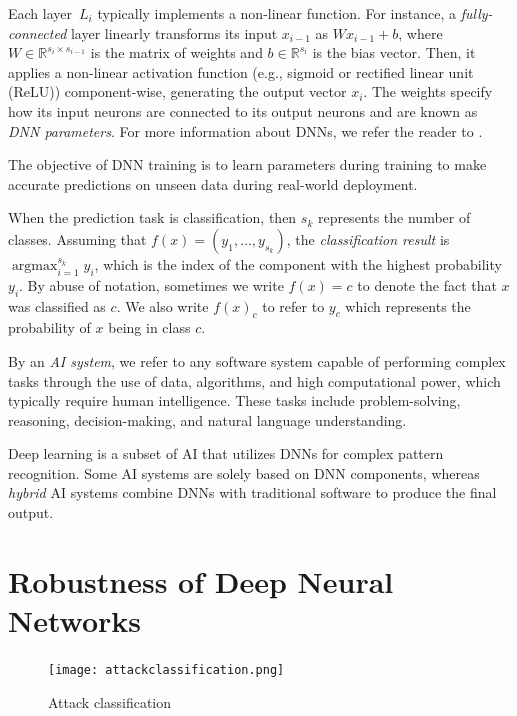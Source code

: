 Each layer~$L_i$ typically implements a non-linear function. For instance, a \emph{fully-connected} layer linearly transforms its input $x_{i-1}$ as $W x_{i-1} + b$, where $W\in\mathbb{R}^{s_{i} \times s_{i-1}}$ is the matrix of weights and $b\in\mathbb{R}^{s_i}$ is the bias vector. Then, it applies a non-linear activation function (e.g., sigmoid or rectified linear unit (ReLU)) component-wise, generating the output vector $x_i$. The weights specify how its input neurons are connected to its output neurons and are known as \emph{DNN parameters}. For more information about DNNs, we refer the reader to \cite{dnn_archi, Hassija, Liang}.

The objective of DNN training is to learn parameters during training to make accurate predictions on unseen data during real-world deployment.

When the prediction task is classification, then $s_k$ represents the number of classes. Assuming that $f(x) = (y_1,\dots,y_{s_k})$, the \emph{classification result} is $\displaystyle\mathop{\text{argmax}}_{i=1}^{s_k} y_i$, which is the index of the component with the highest probability $y_i$. By abuse of notation, sometimes we write $f(x)=c$ to denote the fact that $x$ was classified as $c$. We also write $f(x)_c$ to refer to $y_c$ which represents the probability of $x$ being in class $c$.

By an \emph{AI system}, we refer to any software system capable of performing complex tasks through the use of data, algorithms, and high computational power, which typically require human intelligence. These tasks include problem-solving, reasoning, decision-making, and natural language understanding.

Deep learning is a subset of AI that utilizes DNNs for complex pattern recognition. Some AI systems are solely based on DNN components, whereas \emph{hybrid} AI systems combine DNNs with traditional software to produce the final output.

\section{Robustness of Deep Neural Networks}

\begin{figure}[h]
  \centering
  \texttt{[image: attackclassification.png]}
  \caption{Attack classification}
  \label{fig:adv_threats}
\end{figure}


